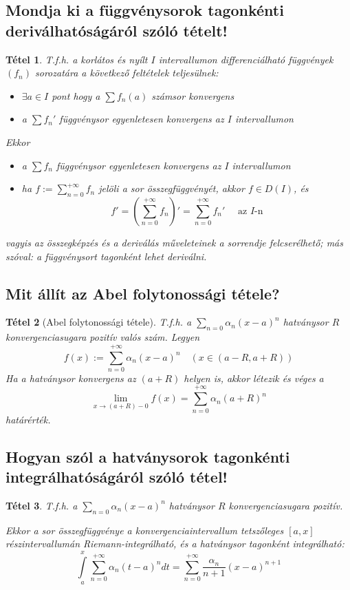 \documentclass[12pt,a4paper]{article}
\newcommand{\fn}{f_n}
\newcommand{\bb}[1]{\left( #1 \right)}
\newtheorem{tet}{Tétel}[section]
\begin{document}
\subsection{Mondja ki a függvénysorok tagonkénti deriválhatóságáról szóló tételt!}
\begin{tet}
T.f.h. a korlátos és nyílt $I$ intervallumon differenciálható függvények $\bb{\fn}$ sorozatára a következő feltételek teljesülnek:
\begin{itemize}
\item[(a)] $\exists a \in I $ pont hogy a $\sum\fn(a)$ számsor konvergens
\item[(b)] a $\sum\fn'$ függvénysor egyenletesen konvergens az $I$ intervallumon
\end{itemize}
Ekkor
\begin{itemize}
\item a $\sum\fn$ függvénysor egyenletesen konvergens az $I$ intervallumon
\item ha $f:=\sum\limits_{n=0}^{+\infty}\fn$ jelöli a sor összegfüggvényét, akkor $f \in D(I)$, és
\[
f'=\bb{\sum\limits_{n=0}^{+\infty}\fn}' = \sum\limits_{n=0}^{+\infty}\fn' \quad \text{ az } I\text{-n}
\]
\end{itemize}
vagyis az összegképzés és a deriválás műveleteinek a sorrendje felcserélhető; más szóval: a függvénysort tagonként lehet deriválni.
\end{tet}
\subsection{Mit állít az Abel folytonossági tétele?}
\begin{tet}[Abel folytonossági tétele]
T.f.h. a $\sum\limits_{n=0}\alpha_n(x-a)^n $ hatványsor
$R$ konvergenciasugara pozitív valós szám. Legyen
\[
f(x) := \sum\limits_{n=0}^{+\infty} \alpha_n(x-a)^n  \quad \bb{x \in \bb{a-R,a+R}}
\]
Ha a hatványsor konvergens az $(a + R)$ helyen is, akkor létezik és véges a
\[
\lim\limits_{x\to\bb{a+R}-0} f(x) = \sum\limits_{n=0}^{+\infty} \alpha_n(a+R)^n
\]
határérték.
\end{tet}

\subsection{Hogyan szól a hatványsorok tagonkénti integrálhatóságáról szóló tétel!}
\begin{tet}
T.f.h. a $\sum\limits_{n=0}\alpha_n(x-a)^n $ hatványsor $R$ konvergenciasugara pozitív. 

Ekkor a sor összegfüggvénye a konvergenciaintervallum tetszőleges $[a, x]$ részintervallumán Riemann-integrálható, és a hatványsor tagonként integrálható:
\[
\int\limits_a^x \sum\limits_{n=0}^{+\infty} \alpha_n(t-a)^n dt= \sum\limits_{n=0}^{+\infty} \frac{\alpha_n}{n+1}(x-a)^{n+1}
\]
\end{tet}
\end{document}
